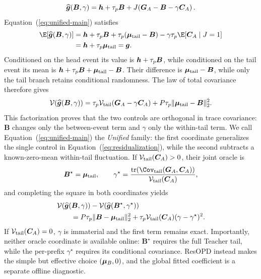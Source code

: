 \begin{equation}
 \widehat{\bm{g}}(\bm B,\gamma)
 =\bm{h}+\tau_p\bm B
 +J\!\left(\bm{G}_A-\bm B-\gamma\bm{C}_A\right).
 \label{eq:unified-main}
\end{equation}
Equation~(\ref{eq:unified-main}) satisfies
\begin{equation}
 \begin{aligned}
 \E\!\left[\widehat{\bgrad}(\bm B,\gamma)\right]
 &=\bhead+\tau_p\bm B
   +\tau_p(\bmean_{\mathrm{tail}}-\bm B)
   -\gamma\tau_p\E[\bfluct_A\mid J=1]\\
 &=\bhead+\tau_p\bmean_{\mathrm{tail}}
  =\bgrad.
 \end{aligned}
 \label{eq:family-unbiased-proof}
\end{equation}
Conditioned on the head event its value is $\bm{h}+\tau_p\bm B$, while conditioned
on the tail event its mean is
$\bm{h}+\tau_p\bm B+\bm{\mu}_{\mathrm{tail}}-\bm B$. Their difference is
$\bm{\mu}_{\mathrm{tail}}-\bm B$, while only the tail branch retains conditional randomness.
The law of total covariance therefore gives
\begin{equation}
 \mathcal V\!\left(\widehat{\bm{g}}(\bm B,\gamma)\right)
 =\tau_p\mathcal V_{\mathrm{tail}}(\bm{G}_A-\gamma\bm{C}_A)
 +P\tau_p\lVert\bm{\mu}_{\mathrm{tail}}-\bm B\rVert_2^2.
 \label{eq:two-level-variance}
\end{equation}
This factorization proves that the two controls are orthogonal in trace
covariance: $\bm B$ changes only the between-event term and $\gamma$ only
the within-tail term. We call Equation~(\ref{eq:unified-main}) the
\emph{Unified} family: the first coordinate generalizes the single control in
Equation~(\ref{eq:residualization}), while the second subtracts a
known-zero-mean within-tail fluctuation. If
$\mathcal V_{\mathrm{tail}}(\bm{C}_A)>0$, their joint
oracle is
\begin{equation}
 \bm B^\star=\bmean_{\mathrm{tail}},\qquad
 \gamma^\star=
 \frac{\operatorname{tr}\!\left(
       \Cov_{\mathrm{tail}}(\btoken_A,\bfluct_A)\right)}
      {\mathcal V_{\mathrm{tail}}(\bfluct_A)},
 \label{eq:joint-oracle}
\end{equation}
and completing the square in both coordinates yields
\begin{equation}
 \begin{aligned}
 &\mathcal V\!\left(\widehat{\bm{g}}(\bm B,\gamma)\right)
 -\mathcal V\!\left(
   \widehat{\bm{g}}(\bm B^\star,\gamma^\star)\right)\\
 &\qquad
 =P\tau_p\lVert\bm B-\bm{\mu}_{\mathrm{tail}}\rVert_2^2
 +\tau_p\mathcal V_{\mathrm{tail}}(\bm{C}_A)
  (\gamma-\gamma^\star)^2.
 \end{aligned}
 \label{eq:unified-regret-main}
\end{equation}
If $\mathcal V_{\mathrm{tail}}(\bm{C}_A)=0$, $\gamma$ is immaterial and the first term
remains exact. Importantly, neither oracle coordinate is available online:
$\bm B^\star$ requires the full Teacher tail, while the per-prefix $\gamma^\star$
requires its conditional covariance. ResOPD instead makes the
simple but effective choice $(\bm{\mu}_B,0)$, and the global fitted coefficient is a
separate offline diagnostic.

